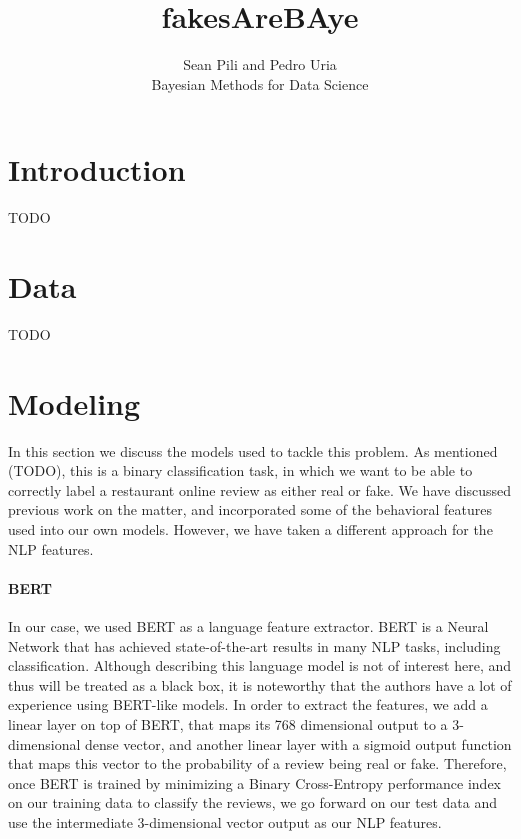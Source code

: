 \documentclass[man, floatsintext, 10pt]{apa6}
\title{fakesAreBAye}
\author{Sean Pili and Pedro Uria \\ Bayesian Methods for Data Science}
\affiliation{GWU}
\begin{document}
\maketitle

\section{Introduction}

TODO

\section{Data}

TODO

\section{Modeling}

In this section we discuss the models used to tackle this problem. As mentioned (TODO), this is a binary classification task, in which we want to be able to correctly label a restaurant online review as either real or fake. We have discussed previous work on the matter, and incorporated some of the behavioral features used into our own models. However, we have taken a different approach for the NLP features. 

\vspace{2mm}

\paragraph{BERT} In our case, we used BERT as a language feature extractor. BERT is a Neural Network that has achieved state-of-the-art results in many NLP tasks, including classification. Although describing this language model is not of interest here, and thus will be treated as a black box, it is noteworthy that the authors have a lot of experience using BERT-like models. In order to extract the features, we add a linear layer on top of BERT, that maps its 768 dimensional output to a 3-dimensional dense vector, and another linear layer with a sigmoid output function that maps this vector to the probability of a review being real or fake. Therefore, once BERT is trained by minimizing a Binary Cross-Entropy performance index on our training data to classify the reviews, we go forward on our test data and use the intermediate 3-dimensional vector output as our NLP features. 
\end{document}
